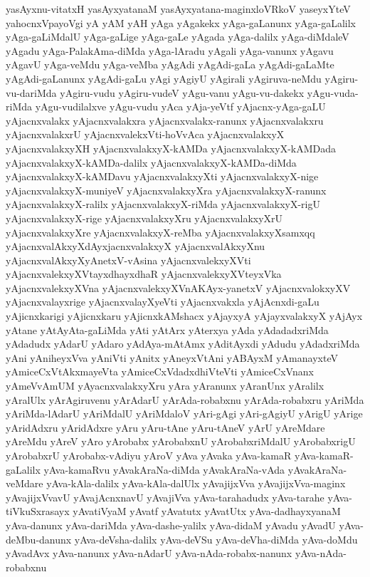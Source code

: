 {yasAyxnu-vitatxH
yasAyxyatanaM
yasAyxyatana-maginxloVRkoV
yaseyxYteV
yahocnxVpayoVgi
yA
yAM
yAH
yAga
yAgakekx
yAga-gaLanunx
yAga-gaLalilx
yAga-gaLiMdalU
yAga-gaLige
yAga-gaLe
yAgada
yAga-dalilx
yAga-diMdaleV
yAgadu
yAga-PalakAma-diMda
yAga-lAradu
yAgali
yAga-vanunx
yAgavu
yAgavU
yAga-veMdu
yAga-veMba
yAgAdi
yAgAdi-gaLa
yAgAdi-gaLaMte
yAgAdi-gaLanunx
yAgAdi-gaLu
yAgi
yAgiyU
yAgirali
yAgiruva-neMdu
yAgiru-vu-dariMda
yAgiru-vudu
yAgiru-vudeV
yAgu-vanu
yAgu-vu-dakekx
yAgu-vuda-riMda
yAgu-vudilalxve
yAgu-vudu
yAca
yAja-yeVtf
yAjacnx-yAga-gaLU
yAjacnxvalakx
yAjacnxvalakxra
yAjacnxvalakx-ranunx
yAjacnxvalakxru
yAjacnxvalakxrU
yAjacnxvalekxVti-hoVvAca
yAjacnxvalakxyX
yAjacnxvalakxyXH
yAjacnxvalakxyX-kAMDa
yAjacnxvalakxyX-kAMDada
yAjacnxvalakxyX-kAMDa-dalilx
yAjacnxvalakxyX-kAMDa-diMda
yAjacnxvalakxyX-kAMDavu
yAjacnxvalakxyXti
yAjacnxvalakxyX-nige
yAjacnxvalakxyX-muniyeV
yAjacnxvalakxyXra
yAjacnxvalakxyX-ranunx
yAjacnxvalakxyX-ralilx
yAjacnxvalakxyX-riMda
yAjacnxvalakxyX-rigU
yAjacnxvalakxyX-rige
yAjacnxvalakxyXru
yAjacnxvalakxyXrU
yAjacnxvalakxyXre
yAjacnxvalakxyX-reMba
yAjacnxvalakxyXsamxqq
yAjacnxvalAkxyXdAyxjacnxvalakxyX
yAjacnxvalAkxyXnu
yAjacnxvalAkxyXyAnetxV-vAsina
yAjacnxvalekxyXVti
yAjacnxvalekxyXVtayxdhayxdhaR
yAjacnxvalekxyXVteyxVka
yAjacnxvalekxyXVna
yAjacnxvalekxyXVnAKAyx-yanetxV
yAjacnxvalokxyXV
yAjacnxvalayxrige
yAjacnxvalayXyeVti
yAjacnxvakxla
yAjAcnxdi-gaLu
yAjicnxkarigi
yAjicnxkaru
yAjicnxkAMshacx
yAjayxyA
yAjayxvalakxyX
yAjAyx
yAtane
yAtAyAta-gaLiMda
yAti
yAtArx
yAterxya
yAda
yAdadadxriMda
yAdadudx
yAdarU
yAdaro
yAdAya-mAtAmx
yAditAyxdi
yAdudu
yAdadxriMda
yAni
yAniheyxVva
yAniVti
yAnitx
yAneyxVtAni
yABAyxM
yAmanayxteV
yAmiceCxVtAkxmayeVta
yAmiceCxVdadxdhiVteVti
yAmiceCxVnanx
yAmeVvAmUM
yAyacnxvalakxyXru
yAra
yAranunx
yAranUnx
yAralilx
yAralUlx
yArAgiruvenu
yArAdarU
yArAda-robabxnu
yArAda-robabxru
yAriMda
yAriMda-lAdarU
yAriMdalU
yAriMdaloV
yAri-gAgi
yAri-gAgiyU
yArigU
yArige
yAridAdxru
yAridAdxre
yAru
yAru-tAne
yAru-tAneV
yArU
yAreMdare
yAreMdu
yAreV
yAro
yArobabx
yArobabxnU
yArobabxriMdalU
yArobabxrigU
yArobabxrU
yArobabx-vAdiyu
yAroV
yAva
yAvaka
yAva-kamaR
yAva-kamaR-gaLalilx
yAva-kamaRvu
yAvakAraNa-diMda
yAvakAraNa-vAda
yAvakAraNa-veMdare
yAva-kAla-dalilx
yAva-kAla-dalUlx
yAvajijxVva
yAvajijxVva-maginx
yAvajijxVvavU
yAvajAcnxnavU
yAvajiVva
yAva-tarahadudx
yAva-tarahe
yAva-tiVkuSxrasayx
yAvatiVyaM
yAvatf
yAvatutx
yAvatUtx
yAva-dadhayxyanaM
yAva-danunx
yAva-dariMda
yAva-dashe-yalilx
yAva-didaM
yAvadu
yAvadU
yAva-deMbu-danunx
yAva-deVsha-dalilx
yAva-deVSu
yAva-deVha-diMda
yAva-doMdu
yAvadAvx
yAva-nanunx
yAva-nAdarU
yAva-nAda-robabx-nanunx
yAva-nAda-robabxnu
}
